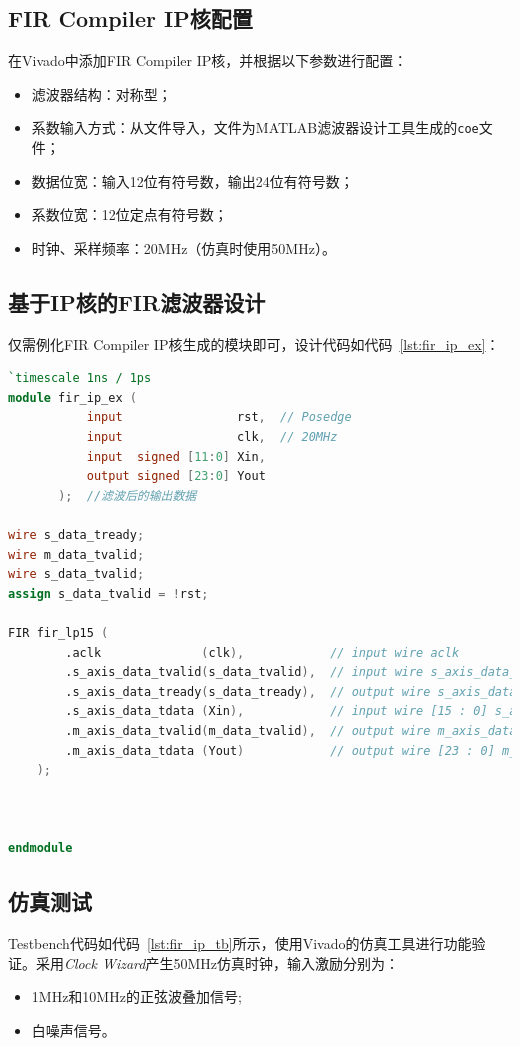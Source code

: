 \subsection{FIR Compiler IP核配置}
在Vivado中添加FIR Compiler IP核，并根据以下参数进行配置：
\begin{itemize}
    \item 滤波器结构：对称型；
    \item 系数输入方式：从文件导入，文件为MATLAB滤波器设计工具生成的\texttt{coe}文件；
    \item 数据位宽：输入12位有符号数，输出24位有符号数；
    \item 系数位宽：12位定点有符号数；
    \item 时钟、采样频率：20MHz（仿真时使用50MHz）。
\end{itemize}
\subsection{基于IP核的FIR滤波器设计}
仅需例化FIR Compiler IP核生成的模块即可，设计代码如代码~\ref{lst:fir_ip_ex}：
\begin{lstlisting}[language=verilog,caption={基于IP核的FIR滤波器设计},label=lst:fir_ip_ex]
    `timescale 1ns / 1ps
module fir_ip_ex (
           input                rst,  // Posedge
           input                clk,  // 20MHz
           input  signed [11:0] Xin,
           output signed [23:0] Yout
       );  //滤波后的输出数据

wire s_data_tready;
wire m_data_tvalid;
wire s_data_tvalid;
assign s_data_tvalid = !rst;

FIR fir_lp15 (
        .aclk              (clk),            // input wire aclk
        .s_axis_data_tvalid(s_data_tvalid),  // input wire s_axis_data_tvalid
        .s_axis_data_tready(s_data_tready),  // output wire s_axis_data_tready
        .s_axis_data_tdata (Xin),            // input wire [15 : 0] s_axis_data_tdata
        .m_axis_data_tvalid(m_data_tvalid),  // output wire m_axis_data_tvalid
        .m_axis_data_tdata (Yout)            // output wire [23 : 0] m_axis_data_tdata
    );



endmodule
\end{lstlisting}
\subsection{仿真测试}
Testbench代码如代码~\ref{lst:fir_ip_tb}所示，使用Vivado的仿真工具进行功能验证。采用\textit{Clock Wizard}产生50MHz仿真时钟，输入激励分别为：
\begin{itemize}
    \item 1MHz和10MHz的正弦波叠加信号;
    \item 白噪声信号。
\end{itemize}

